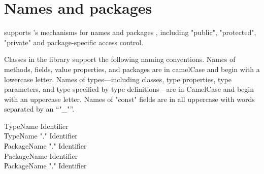 \chapter{Names and packages}
\label{packages} 

\Xten{} supports \java's mechanisms for names and packages \cite[\S
6,\S 7]{jls2}, including \xcd"public", \xcd"protected", \xcd"private"
and package-specific access control. 

Classes in the \Xten{} library support the following naming conventions.
Names of methods, fields, value properties, and packages are in camelCase and begin with a lowercase letter.
Names of types---including classes, type properties, type
parameters, and type specified by type definitions---are in CamelCase and begin with an uppercase letter.
Names of \xcd"const" fields are in all uppercase with words
separated by an ``\xcd"_"''.

\begin{grammar}
TypeName   \: Identifier \\
        \| TypeName \xcd"." Identifier \\
        \| PackageName \xcd"." Identifier \\
PackageName   \: Identifier \\
        \| PackageName \xcd"." Identifier \\
\end{grammar}

